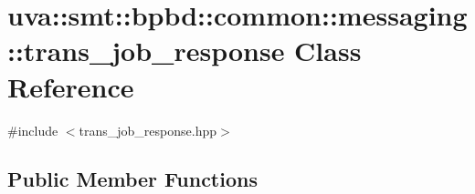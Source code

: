 \hypertarget{classuva_1_1smt_1_1bpbd_1_1common_1_1messaging_1_1trans__job__response}{}\section{uva\+:\+:smt\+:\+:bpbd\+:\+:common\+:\+:messaging\+:\+:trans\+\_\+job\+\_\+response Class Reference}
\label{classuva_1_1smt_1_1bpbd_1_1common_1_1messaging_1_1trans__job__response}


{\ttfamily \#include $<$trans\+\_\+job\+\_\+response.\+hpp$>$}

\subsection*{Public Member Functions}

